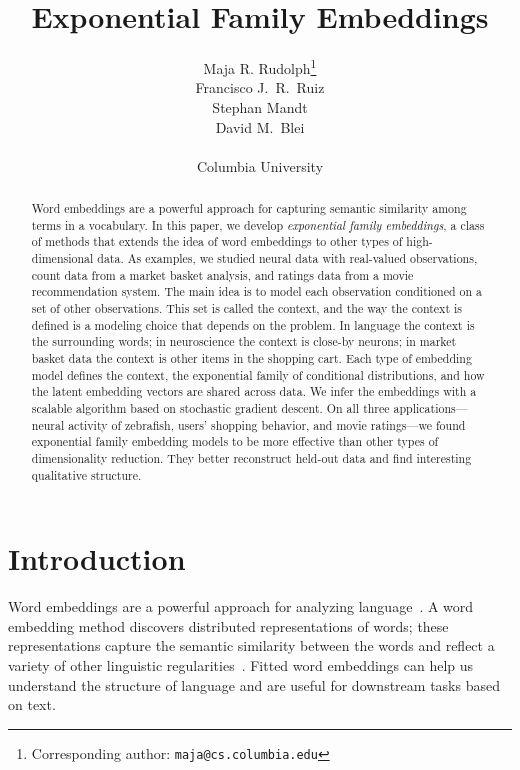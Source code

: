 \documentclass[12pt]{article}
\title{Exponential Family Embeddings}
\author{
  Maja R. Rudolph\footnote{Corresponding author: \texttt{maja@cs.columbia.edu}} \\
  Francisco J.~R.~Ruiz \\
  Stephan Mandt\\
  David M.~Blei\\ \\
  Columbia University \\
}
\begin{document}
\maketitle

\begin{abstract}
  Word embeddings are a powerful approach for capturing semantic
  similarity among terms in a vocabulary.  In this paper, we develop
  \textit{exponential family embeddings}, a class of methods that
  extends the idea of word embeddings to other types of
  high-dimensional data. As examples, we studied neural data with
  real-valued observations, count data from a market basket analysis,
  and ratings data from a movie recommendation system.  The main idea
  is to model each observation conditioned on a set of other
  observations.  This set is called the context, and the way the
  context is defined is a modeling choice that depends on the problem.
  In language the context is the surrounding words; in neuroscience
  the context is close-by neurons; in market basket data the context
  is other items in the shopping cart.  Each type of embedding model
  defines the context, the exponential family of conditional
  distributions, and how the latent embedding vectors are shared
  across data. We infer the embeddings with a scalable algorithm based
  on stochastic gradient descent. On all three applications---neural
  activity of zebrafish, users' shopping behavior, and movie
  ratings---we found exponential family embedding models to be more
  effective than other types of dimensionality reduction.  They better
  reconstruct held-out data and find interesting qualitative
  structure.
\end{abstract}

\section{Introduction}

Word embeddings are a powerful approach for analyzing
language~\citep{bengio2006neural,mikolov2013efficient,mikolov2013distributed,pennington2014glove}.
A word embedding method discovers distributed representations of
words; these representations capture the semantic similarity between
the words and reflect a variety of other linguistic
regularities~\citep{rumelhart1986learning,bengio2006neural,mikolov2013linguistic}.
Fitted word embeddings can help us understand the structure of
language and are useful for downstream tasks based on text.
\end{document}
